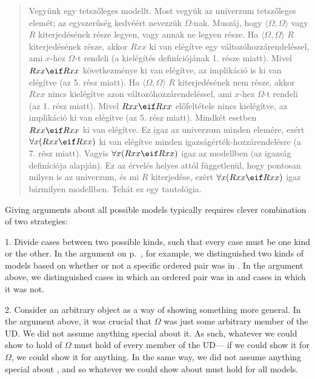 \begin{quote}
Vegyünk egy tetszőleges  modellt. Most vegyük az univerzum tetszőleges elemét; az egyszerűség kedvéért nevezzük $\Omega$-nak. Muszáj, hogy $\langle\Omega,\Omega\rangle$ vagy $R$ kiterjedésének része legyen, vagy annak ne legyen része. Ha $\langle\Omega,\Omega\rangle$  $R$ kiterjedésének része, akkor $Rxx$ ki van elégítve egy változóhozzárendeléssel, ami $x$-hez $\Omega$-t rendeli (a kielégítés definíciójának 1. része miatt). Mivel $Rxx\eif Rxx$ következménye ki van elégítve, az implikáció is ki van elégítve (az 5. rész miatt).
Ha $\langle\Omega,\Omega\rangle$  $R$ kiterjedésének nem része, akkor $Rxx$ nincs kielégítve azon változóhozzárendeléssel, ami $x$-hez $\Omega$-t rendeli (az 1. rész miatt). Mivel $Rxx\eif Rxx$ előfeltétele nincs kielégítve, az implikáció ki van elégítve (az 5. rész miatt). Mindkét esetben $Rxx\eif Rxx$ ki van elégítve. Ez igaz az univerzum minden elemére, ezért $\forall x(Rxx \eif Rxx)$ ki van elégítve minden igazságérték-hozzárendelésre (a 7. rész miatt). Vagyis $\forall x(Rxx \eif Rxx)$ igaz az  modellben (az igazság definíciója alapján). Ez az érvelés helyes attól függetlenül, hogy pontosan milyen is az univerzum, és mi $R$ kiterjedése, ezért $\forall x(Rxx \eif Rxx)$ igaz bármilyen modellben. Tehát ez egy tautológia.
\end{quote}


Giving arguments about all possible models typically requires clever combination of two strategies:

1. Divide cases between two possible kinds, such that every case must be one kind or the other.  In the argument on p.~\pageref{allmodels1}, for example, we distinguished two kinds of models based on whether or not a specific ordered pair was in . In the argument above, we distinguished cases in which an ordered pair was in  and cases in which it was not.

2. Consider an arbitrary object as a way of showing something more general. In the argument above, it was crucial that $\Omega$ was just some arbitrary member of the UD. We did not assume anything special about it. As such, whatever we could show to hold of $\Omega$ must hold of every member of the UD--- if we could show it for $\Omega$, we could show it for anything. In the same way, we did not assume anything special about , and so whatever we could show about  must hold for all models.

